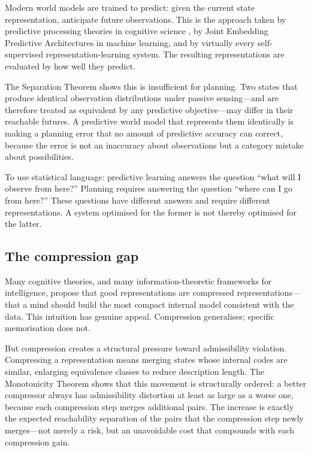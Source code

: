 \documentclass[11pt,a4paper]{article}
\begin{document}
Modern world models are trained to predict: given the current state
representation, anticipate future observations. This is the approach taken by
predictive processing theories in cognitive science \citep{clark2013whatever},
by Joint Embedding Predictive Architectures in machine learning, and by virtually
every self-supervised representation-learning system. The resulting representations
are evaluated by how well they predict.

The Separation Theorem shows this is insufficient for planning. Two states that
produce identical observation distributions under passive sensing---and are
therefore treated as equivalent by any predictive objective---may differ in
their reachable futures. A predictive world model that represents them identically
is making a planning error that no amount of predictive accuracy can correct,
because the error is not an inaccuracy about observations but a category mistake
about possibilities.

To use statistical language: predictive learning answers the question
``what will I observe from here?'' Planning requires answering the question
``where can I go from here?'' These questions have different answers and require
different representations. A system optimised for the former is not thereby
optimised for the latter.

\subsection{The compression gap}

Many cognitive theories, and many information-theoretic frameworks for intelligence,
propose that good representations are compressed representations---that a mind
should build the most compact internal model consistent with the data. This
intuition has genuine appeal. Compression generalises; specific memorisation
does not.

But compression creates a structural pressure toward admissibility violation.
Compressing a representation means merging states whose internal codes are
similar, enlarging equivalence classes to reduce description length. The
Monotonicity Theorem shows that this movement is structurally ordered: a better
compressor always has admissibility distortion at least as large as a worse one,
because each compression step merges additional pairs. The increase is exactly
the expected reachability separation of the pairs that the compression step newly
merges---not merely a risk, but an unavoidable cost that compounds with each
compression gain.
\end{document}
